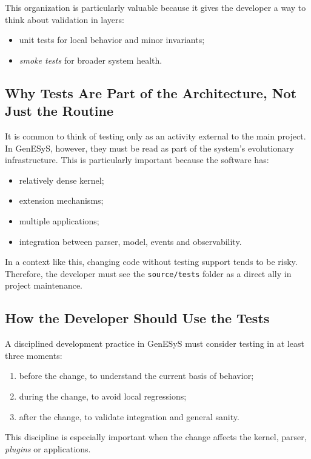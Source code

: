 This organization is particularly valuable because it gives the developer a way to think about validation in layers:
\begin{itemize}
 \item unit tests for local behavior and minor invariants;
 \item \textit{smoke tests} for broader system health.
\end{itemize}

\subsection{Why Tests Are Part of the Architecture, Not Just the Routine}
\label{subsec:cap10_testes_parte_arquitetura}

It is common to think of testing only as an activity external to the main project. In GenESyS, however, they must be read as part of the system's evolutionary infrastructure. This is particularly important because the software has:
\begin{itemize}
 \item relatively dense kernel;
 \item extension mechanisms;
 \item multiple applications;
 \item integration between parser, model, events and observability.
\end{itemize}

In a context like this, changing code without testing support tends to be risky. Therefore, the developer must see the \texttt{source/tests} folder as a direct ally in project maintenance.

\subsection{How the Developer Should Use the Tests}
\label{subsec:cap10_como_usar_testes}

A disciplined development practice in GenESyS must consider testing in at least three moments:
\begin{enumerate}
 \item before the change, to understand the current basis of behavior;
 \item during the change, to avoid local regressions;
 \item after the change, to validate integration and general sanity.
\end{enumerate}

This discipline is especially important when the change affects the kernel, parser, \textit{plugins} or applications.

